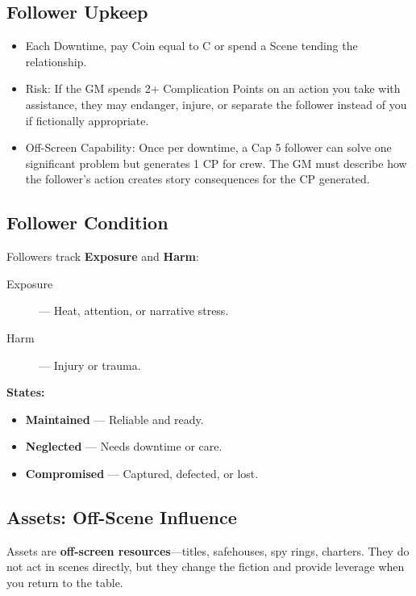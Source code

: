 \subsection*{Follower Upkeep}

\begin{itemize}
    \item Each Downtime, pay Coin equal to C or spend a Scene tending the relationship.
    \item Risk: If the GM spends 2+ Complication Points on an action you take with assistance, they may endanger, injure, or separate the follower instead of you if fictionally appropriate.
    \item Off-Screen Capability: Once per downtime, a Cap 5 follower can solve one significant problem but generates 1 CP for crew. The GM must describe how the follower's action creates story consequences for the CP generated.
\end{itemize}

\subsection*{Follower Condition}

Followers track \textbf{Exposure} and \textbf{Harm}:

\begin{description}
    \item[Exposure] — Heat, attention, or narrative stress.
    \item[Harm] — Injury or trauma.
\end{description}

\textbf{States:}
\begin{itemize}
    \item \textbf{Maintained} — Reliable and ready.
    \item \textbf{Neglected} — Needs downtime or care.
    \item \textbf{Compromised} — Captured, defected, or lost.
\end{itemize}

\subsection*{Assets: Off-Scene Influence}

Assets are \textbf{off-screen resources}—titles, safehouses, spy rings, charters. They do not act in scenes directly, but they change the fiction and provide leverage when you return to the table.

